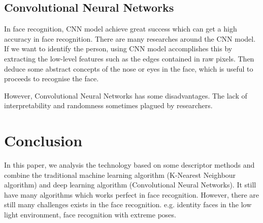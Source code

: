 \documentclass[10pt,twocolumn,letterpaper]{article}
\begin{document}
\subsection{Convolutional Neural Networks}
In face recognition, CNN model achieve great success which can get a high accuracy in face recognition.
There are many researches around the CNN model.
If we want to identify the person, using CNN model accomplishes this by extracting the low-level features such as the edges contained in raw pixels.
Then deduce some abstract concepts of the nose or eyes in the face, which is useful to proceeds to recognise the face.

However, Convolutional Neural Networks has some disadvantages.
The lack of interpretability and randomness sometimes plagued by researchers.


\section{Conclusion}
In this paper, we analysis the technology based on some descriptor methods and combine the traditional machine learning algorithm (K-Nearest Neighbour algorithm) and deep learning algorithm (Convolutional Neural Networks).
It still have many algorithms which works perfect in face recognition.
However, there are still many challenges exists in the face recognition. e.g. identity faces in the low light environment, face recognition with extreme poses.




{\small


}
\end{document}

